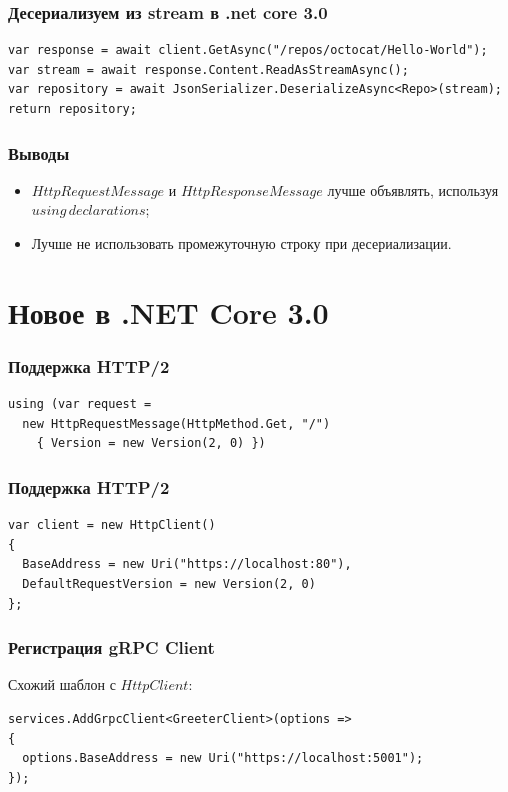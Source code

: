 \documentclass[17pt,aspectratio=169]{beamer}
\begin{document}
\begin{frame}[fragile]
\frametitle{Десериализуем из stream в .net core 3.0}
\begin{lstlisting}
var response = await client.GetAsync("/repos/octocat/Hello-World");
var stream = await response.Content.ReadAsStreamAsync();
var repository = await JsonSerializer.DeserializeAsync<Repo>(stream);
return repository;
\end{lstlisting}
\end{frame}

\begin{frame}
\frametitle{Выводы}
\begin{itemize}
	\item <1-> $HttpRequestMessage$ и $HttpResponseMessage$ лучше объявлять, используя $using\,declarations$;
	\item <2-> Лучше не использовать промежуточную строку при десериализации.
\end{itemize}
\end{frame}

\section{Новое в .NET Core 3.0}
\begin{frame}[fragile]
\frametitle{Поддержка HTTP/2}
\begin{lstlisting}
using (var request = 
  new HttpRequestMessage(HttpMethod.Get, "/") 
    { Version = new Version(2, 0) })
\end{lstlisting}
\end{frame}

\begin{frame}[fragile]
\frametitle{Поддержка HTTP/2}
\begin{lstlisting}
var client = new HttpClient()
{
  BaseAddress = new Uri("https://localhost:80"),
  DefaultRequestVersion = new Version(2, 0)
};
\end{lstlisting}
\end{frame}

\begin{frame}[fragile]
\frametitle{Регистрация gRPC Client}
Схожий шаблон с $HttpClient$:
\newline
\begin{lstlisting}
services.AddGrpcClient<GreeterClient>(options =>
{
  options.BaseAddress = new Uri("https://localhost:5001");
});
\end{lstlisting}
\end{frame}
\end{document}
